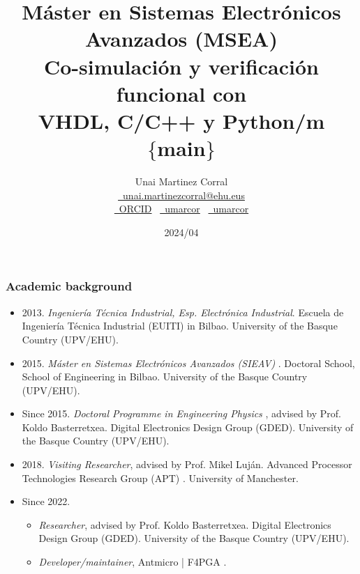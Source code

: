 \documentclass{beamer}
\title{\small Máster en Sistemas Electrónicos Avanzados (MSEA)\\\Large Co-simulación y verificación funcional con\\VHDL, C/C++ y Python/m\\{\small $\{$main$\}$}}
\author{Unai Martinez Corral\\\href{mailto:unai.martinezcorral@ehu.eus}{\faEnvelope~unai.martinezcorral@ehu.eus}\\\href{https://orcid.org/0000-0003-1752-9181}{\faGlobe~ORCID} ~\href{https://github.com/umarcor}{\faGithub~umarcor} ~\href{https://gitlab.com/umarcor}{\faGitlab~umarcor}}
\institute{Escuela de Ingeniería de Bilbao\\Universidad del País Vasco/Euskal Herriko Unibertsitatea (UPV/EHU)}
\date{2024/04}
\begin{document}
\frame{\titlepage}

\begin{frame}
\frametitle{Academic background}
\small
\vfill
\begin{itemize}
\item
  2013.
  \emph{Ingeniería Técnica Industrial, Esp. Electrónica Industrial}.
  \tiny
  Escuela de Ingeniería Técnica Industrial (EUITI) in Bilbao.
  University of the Basque Country (UPV/EHU).
  \small

\vfill

\item
  2015.
  \emph{Máster en Sistemas Electrónicos Avanzados (SIEAV)} \href{https://www.ehu.eus/es/web/master/master-sistemas-electronicos-avanzados}{\faGlobe}.
  \tiny
  Doctoral School, School of Engineering in Bilbao.
  University of the Basque Country (UPV/EHU).
  \small

\vfill

\item
  Since 2015.
  \emph{Doctoral Programme in Engineering Physics} \href{https://www.ehu.eus/en/web/doktoregoak/doctorate-engineering-physics}{\faGlobe},
  advised by Prof. Koldo Basterretxea.
  \tiny
  Digital Electronics Design Group (GDED).
  University of the Basque Country (UPV/EHU).
  \small

\vfill

\item
  2018.
  \emph{Visiting Researcher},
  advised by Prof. Mikel Luján.
  \tiny
  Advanced Processor Technologies Research Group (APT) \href{http://apt.cs.manchester.ac.uk/}{\faGlobe}.
  University of Manchester.
  \small

\item
  Since 2022.
  \begin{itemize}
    \item \emph{Researcher},
  advised by Prof. Koldo Basterretxea.
  \tiny
  Digital Electronics Design Group (GDED).
  University of the Basque Country (UPV/EHU).
  \small

  \item \emph{Developer/maintainer},
  Antmicro \href{https://antmicro.com/}{\faGlobe} | F4PGA \href{https://f4pga.org/}{\faGlobe}.
  \end{itemize}
\end{itemize}
\vfill
\end{frame}
\end{document}
